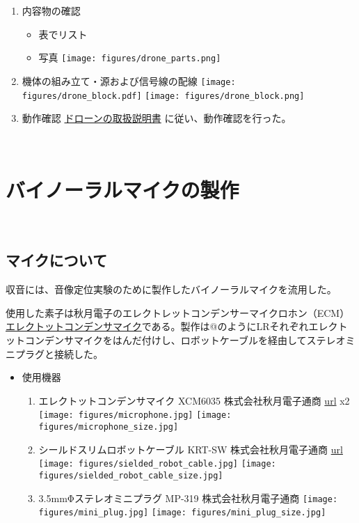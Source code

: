 \begin{enumerate}
\def\labelenumi{\arabic{enumi}.}
\item
  内容物の確認

  \begin{itemize}
  \tightlist
  \item
    表でリスト
  \item
    写真 \texttt{[image: figures/drone\_parts.png]}
  \end{itemize}
\item
  機体の組み立て・源および信号線の配線
  \texttt{[image: figures/drone\_block.pdf]}
  \texttt{[image: figures/drone\_block.png]}
\item
  動作確認
  \href{http://www.lynxmotion.com/images/document/PDF/LynxmotionUAV-QuadrinoNano-UserGuideV1.1.pdf}{ドローンの取扱説明書}
  に従い、動作確認を行った。
\end{enumerate}

\
\section{バイノーラルマイクの製作}\label{binaural-mic}

\
\subsection{マイクについて}\label{about-mic}

収音には、音像定位実験のために製作したバイノーラルマイクを流用した。

使用した素子は秋月電子のエレクトレットコンデンサーマイクロホン（ECM）\href{http://akizukidenshi.com/catalog/g/gP-08181/}{エレクトットコンデンサマイク}である。製作は@のようにLRそれぞれエレクトットコンデンサマイクをはんだ付けし、ロボットケーブルを経由してステレオミニプラグと接続した。

\begin{itemize}
\tightlist
\item
  使用機器

  \begin{enumerate}
  \def\labelenumi{\arabic{enumi}.}
  \item
    エレクトットコンデンサマイク XCM6035 株式会社秋月電子通商
    \href{http://akizukidenshi.com/catalog/g/gP-08181/}{url} x2
    \texttt{[image: figures/microphone.jpg]}
    \texttt{[image: figures/microphone\_size.jpg]}
  \item
    シールドスリムロボットケーブル KRT-SW 株式会社秋月電子通商
    \href{http://akizukidenshi.com/catalog/g/gP-07457/}{url}
    \texttt{[image: figures/sielded\_robot\_cable.jpg]}
    \texttt{[image: figures/sielded\_robot\_cable\_size.jpg]}
  \item
    3.5mmΦステレオミニプラグ MP-319 株式会社秋月電子通商
    \texttt{[image: figures/mini\_plug.jpg]}
    \texttt{[image: figures/mini\_plug\_size.jpg]}
  \end{enumerate}
\end{itemize}

